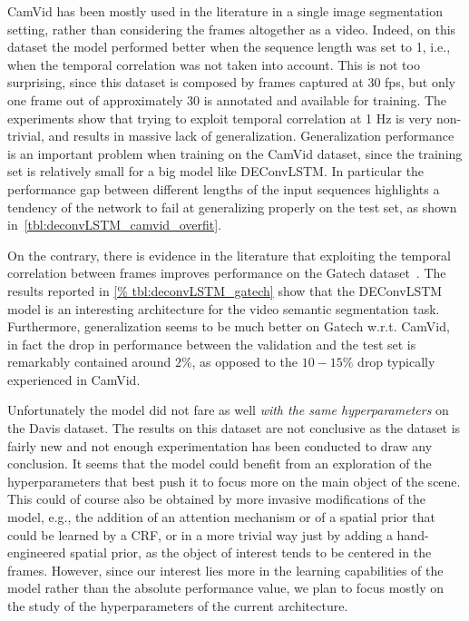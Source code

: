 CamVid has been mostly used in the literature in a single image
segmentation setting, rather than considering the frames altogether as a video.
Indeed, on this dataset the model performed better when the sequence length was
set to 1, i.e., when the temporal correlation was not taken into account.
This is not too surprising, since this dataset is composed by frames captured
at 30 fps, but only one frame out of approximately 30 is annotated and available
for training. The experiments show that trying to exploit temporal correlation
at 1 Hz is very non-trivial, and results in massive lack of generalization.
Generalization performance is an important problem when training on the CamVid
dataset, since the training set is relatively small for a big model like
DEConvLSTM. In particular the performance gap between different lengths of the
input sequences highlights a tendency of the network to fail at generalizing
properly on the test set, as shown in~\autoref{tbl:deconvLSTM_camvid_overfit}.

On the contrary, there is evidence in the literature that exploiting the
temporal correlation between frames improves performance on the Gatech
dataset~\citep{Tran16v2v}. The results reported in \autoref{%
tbl:deconvLSTM_gatech} show that the DEConvLSTM model is an interesting
architecture for the video semantic segmentation task. Furthermore,
generalization seems to be much better on Gatech w.r.t. CamVid, in fact the
drop in performance between the validation and the test set is remarkably
contained around $2\%$, as opposed to the $10-15\%$ drop typically experienced
in CamVid.

Unfortunately the model did not fare as well \emph{with the same
hyperparameters} on the Davis dataset. The results on this dataset are not
conclusive as the dataset is fairly new and not enough experimentation has been
conducted to draw any conclusion. It seems that the model could benefit from an
exploration of the hyperparameters that best push it to focus more on the main
object of the scene. This could of course also be obtained by more invasive
modifications of the model, e.g., the addition of an attention mechanism or of
a spatial prior that could be learned by a CRF, or in a more trivial way just
by adding a hand-engineered spatial prior, as the object of interest tends to
be centered in the frames. However, since our interest lies more in the
learning capabilities of the model rather than the absolute performance value,
we plan to focus mostly on the study of the hyperparameters of the current
architecture.

